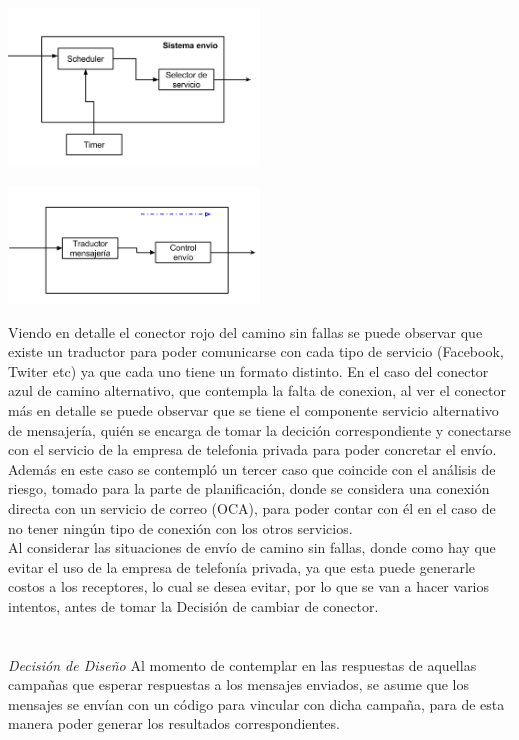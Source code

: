 \documentclass[a4paper, 11pt]{article}
\begin{document}
\centerline{\includegraphics[width=0.5\textwidth]{./diagramas/ArqTP2conector1.png}}
\centerline{\includegraphics[width=0.5\textwidth]{./diagramas/ArqTP2conector2.png}}

Viendo en detalle el conector rojo del camino sin fallas se puede observar que existe un traductor para poder comunicarse con cada tipo de servicio (Facebook, Twiter etc) ya que cada uno tiene un formato distinto.
En el caso del conector azul de camino alternativo, que contempla la falta de conexion, al ver el conector más en detalle se puede observar  que se tiene el componente servicio alternativo de mensajería, quién se encarga de tomar la decición correspondiente y conectarse con el servicio de la empresa de telefonia privada para poder concretar el envío.\\

Además en este caso se contempló un tercer caso que coincide con el análisis de riesgo, tomado para la parte de planificación, donde se considera una conexión directa con un servicio de correo (OCA), para poder contar con él en el caso de no tener ningún tipo de conexión con los otros servicios.\\ %

Al considerar las situaciones de envío de camino sin fallas, donde como hay que evitar el uso de la empresa de telefonía privada, ya que esta puede generarle costos a los receptores, lo cual se desea evitar, por lo que se van a hacer varios intentos, antes de tomar la Decisión de cambiar de conector.\\
\\
\\
\emph{Decisión de Diseño}
Al momento de contemplar en las respuestas de aquellas campañas que esperar respuestas a los mensajes enviados, se asume que los mensajes se envían con un código para vincular con dicha campaña, para de esta manera poder generar los resultados correspondientes.\\
\end{document}
